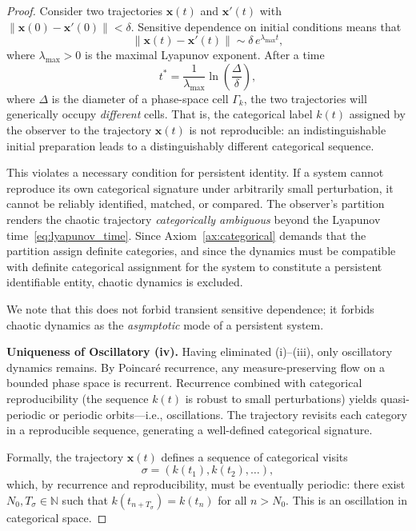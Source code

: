 \documentclass[11pt,twocolumn,a4paper]{article}
\newcommand{\N}{\mathbb{N}}
\begin{document}
\begin{proof}
Consider two trajectories $\bm{x}(t)$ and $\bm{x}'(t)$ with $\|\bm{x}(0) - \bm{x}'(0)\| < \delta$. Sensitive dependence on initial conditions means that
\begin{equation}
    \|\bm{x}(t) - \bm{x}'(t)\| \sim \delta \, e^{\lambda_{\max} t},
\end{equation}
where $\lambda_{\max} > 0$ is the maximal Lyapunov exponent. After a time
\begin{equation}
    t^* = \frac{1}{\lambda_{\max}} \ln\left(\frac{\Delta}{\delta}\right),
    \label{eq:lyapunov_time}
\end{equation}
where $\Delta$ is the diameter of a phase-space cell $\Gamma_k$, the two trajectories will generically occupy \emph{different} cells. That is, the categorical label $k(t)$ assigned by the observer to the trajectory $\bm{x}(t)$ is not reproducible: an indistinguishable initial preparation leads to a distinguishably different categorical sequence.

This violates a necessary condition for persistent identity. If a system cannot reproduce its own categorical signature under arbitrarily small perturbation, it cannot be reliably identified, matched, or compared. The observer's partition renders the chaotic trajectory \emph{categorically ambiguous} beyond the Lyapunov time~\eqref{eq:lyapunov_time}. Since Axiom~\ref{ax:categorical} demands that the partition assign definite categories, and since the dynamics must be compatible with definite categorical assignment for the system to constitute a persistent identifiable entity, chaotic dynamics is excluded.

We note that this does not forbid transient sensitive dependence; it forbids chaotic dynamics as the \emph{asymptotic} mode of a persistent system.

\medskip
\noindent\textbf{Uniqueness of Oscillatory (iv).}
Having eliminated (i)--(iii), only oscillatory dynamics remains. By Poincar\'{e} recurrence, any measure-preserving flow on a bounded phase space is recurrent. Recurrence combined with categorical reproducibility (the sequence $k(t)$ is robust to small perturbations) yields quasi-periodic or periodic orbits---i.e., oscillations. The trajectory revisits each category in a reproducible sequence, generating a well-defined categorical signature.

Formally, the trajectory $\bm{x}(t)$ defines a sequence of categorical visits
\begin{equation}
    \sigma = (k(t_1), k(t_2), \ldots),
\end{equation}
which, by recurrence and reproducibility, must be eventually periodic: there exist $N_0, T_\sigma \in \N$ such that $k(t_{n+T_\sigma}) = k(t_n)$ for all $n > N_0$. This is an oscillation in categorical space.
\end{proof}
\end{document}
